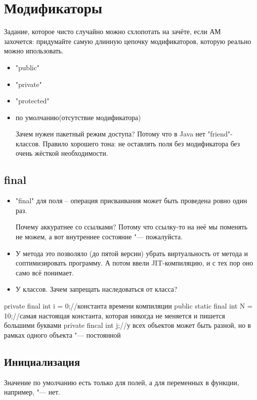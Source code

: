 \section{Модификаторы}
Задание, которое чисто случайно можно схлопотать на зачёте, если АМ захочется:
придумайте самую длинную цепочку модификаторов, которую реально можно ипользовать.

\begin{itemize}
	\item 
		\java"public"
	\item
		\java"private"
	\item
		\java"protected"
	\item 
		по умолчанию(отсутствие модификатора)
		
		Зачем нужен пакетный режим доступа? Потому что в Java нет \cpp"friend"-классов.
		Правило хорошего тона: не оставлять поля без модификатора без очень жёсткой необходимости.
\end{itemize}

\subsection{final}
\begin{itemize}
	\item 
		\java"final" для поля -- операция присваивания может быть проведена ровно один раз.
		
		Почему аккуратнее со ссылками? Потому что ссылку-то на неё мы поменять не можем, а вот внутреннее состояние "--- пожалуйста.
	\item
		У метода это позволяло (до пятой версии) убрать виртуальность от метода и соптимизировать программу. 
		А потом ввели JIT-компиляцию, и с тех пор оно само всё понимает.
	\item
		У классов. Зачем запрещать наследоваться от класса?
\end{itemize}

\begin{javacode}
private final int i = 0;//константа времени компиляции
public static final int N = 10;//самая настоящая константа, которая никогда не меняется и пишется большими буквами
private fincal int j;//у всех объектов может быть разной, но в рамках одного объекта "--- постоянной
\end{javacode}

\subsection{Инициализация}
Значение по умолчанию есть только для полей, а для переменных в функции, например, "--- нет.

